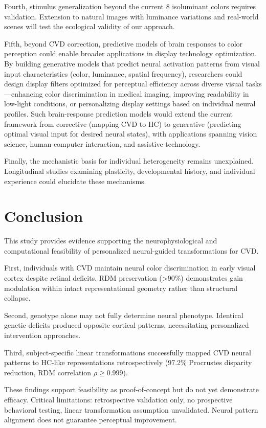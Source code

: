 \documentclass[12pt,a4paper]{article}
\begin{document}
Fourth, stimulus generalization beyond the current 8 isoluminant colors requires validation. Extension to natural images with luminance variations and real-world scenes will test the ecological validity of our approach.

Fifth, beyond CVD correction, predictive models of brain responses to color perception could enable broader applications in display technology optimization. By building generative models that predict neural activation patterns from visual input characteristics (color, luminance, spatial frequency), researchers could design display filters optimized for perceptual efficiency across diverse visual tasks—enhancing color discrimination in medical imaging, improving readability in low-light conditions, or personalizing display settings based on individual neural profiles. Such brain-response prediction models would extend the current framework from corrective (mapping CVD to HC) to generative (predicting optimal visual input for desired neural states), with applications spanning vision science, human-computer interaction, and assistive technology.

Finally, the mechanistic basis for individual heterogeneity remains unexplained. Longitudinal studies examining plasticity, developmental history, and individual experience could elucidate these mechanisms.

\section{Conclusion}

This study provides evidence supporting the neurophysiological and computational feasibility of personalized neural-guided transformations for CVD.

First, individuals with CVD maintain neural color discrimination in early visual cortex despite retinal deficits. RDM preservation (>90\%) demonstrates gain modulation within intact representational geometry rather than structural collapse.

Second, genotype alone may not fully determine neural phenotype. Identical genetic deficits produced opposite cortical patterns, necessitating personalized intervention approaches.

Third, subject-specific linear transformations successfully mapped CVD neural patterns to HC-like representations retrospectively (97.2\% Procrustes disparity reduction, RDM correlation $\rho \geq 0.999$).

These findings support feasibility as proof-of-concept but do not yet demonstrate efficacy. Critical limitations: retrospective validation only, no prospective behavioral testing, linear transformation assumption unvalidated. Neural pattern alignment does not guarantee perceptual improvement.
\end{document}
